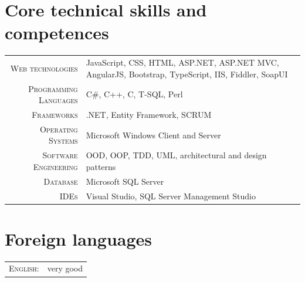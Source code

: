 \documentclass[a4paper,12pt]{article}
\begin{document}
\section{Core technical skills and competences}
\begin{tabular}{r|p{9.5cm}}
	\textsc{Web technologies}
	&\footnotesize{JavaScript, CSS, HTML, ASP.NET, ASP.NET MVC, AngularJS, Bootstrap, TypeScript, IIS, Fiddler, SoapUI} \\
	\textsc{Programming Languages}
	&\footnotesize{C\#, C++, C, T-SQL, Perl} \\
	\textsc{Frameworks}
	&\footnotesize{.NET, Entity Framework, SCRUM} \\
	\textsc{Operating Systems}
	&\footnotesize{Microsoft Windows Client and Server} \\
	\textsc{Software Engineering}
	&\footnotesize{OOD, OOP, TDD, UML, architectural and design patterns} \\
	\textsc{Database}
	&\footnotesize{Microsoft SQL Server} \\
	\textsc{IDEs}
	&\footnotesize{Visual Studio, SQL Server Management Studio} \\
\end{tabular}

\section{Foreign languages}
\begin{tabular}{r|p{11cm}}
	\textsc{English:}&very good\\
\end{tabular}

\end{document}
